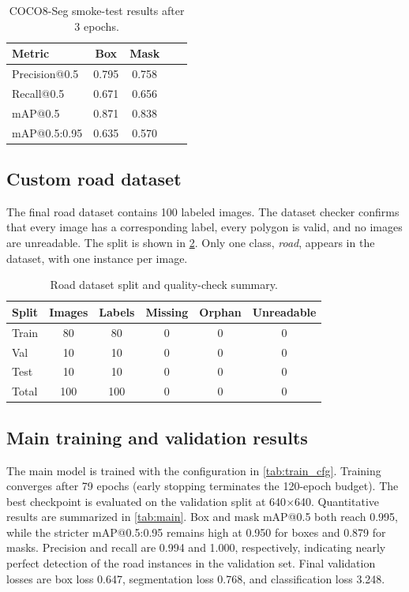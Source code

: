 \documentclass[11pt,a4paper]{article}
\begin{document}
\begin{table}[htbp]
\centering
\caption{COCO8-Seg smoke-test results after 3 epochs.}\label{tab:smoke}
\begin{tabular}{lcccc}
\toprule
\textbf{Metric} & \textbf{Box} & \textbf{Mask} \\
\midrule
Precision@0.5   & 0.795 & 0.758 \\
Recall@0.5      & 0.671 & 0.656 \\
mAP@0.5         & 0.871 & 0.838 \\
mAP@0.5:0.95    & 0.635 & 0.570 \\
\bottomrule
\end{tabular}
\end{table}

\subsection{Custom road dataset}

The final road dataset contains 100 labeled images. The dataset checker confirms that every image has a corresponding label, every polygon is valid, and no images are unreadable. The split is shown in \cref{tab:dataset}. Only one class, \emph{road}, appears in the dataset, with one instance per image.

\begin{table}[htbp]
\centering
\caption{Road dataset split and quality-check summary.}\label{tab:dataset}
\begin{tabular}{lccccc}
\toprule
\textbf{Split} & \textbf{Images} & \textbf{Labels} & \textbf{Missing} & \textbf{Orphan} & \textbf{Unreadable} \\
\midrule
Train & 80  & 80  & 0 & 0 & 0 \\
Val   & 10  & 10  & 0 & 0 & 0 \\
Test  & 10  & 10  & 0 & 0 & 0 \\
\midrule
Total & 100 & 100 & 0 & 0 & 0 \\
\bottomrule
\end{tabular}
\end{table}

\subsection{Main training and validation results}

The main model is trained with the configuration in \cref{tab:train_cfg}. Training converges after 79 epochs (early stopping terminates the 120-epoch budget). The best checkpoint is evaluated on the validation split at 640$\times$640. Quantitative results are summarized in \cref{tab:main}. Box and mask mAP@0.5 both reach 0.995, while the stricter mAP@0.5:0.95 remains high at 0.950 for boxes and 0.879 for masks. Precision and recall are 0.994 and 1.000, respectively, indicating nearly perfect detection of the road instances in the validation set. Final validation losses are box loss 0.647, segmentation loss 0.768, and classification loss 3.248.
\end{document}
